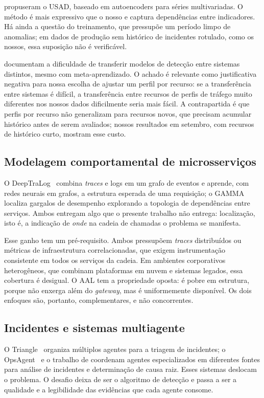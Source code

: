 \documentclass[sigconf,nonacm]{acmart}
\begin{document}
\citet{audibert2020usad} propuseram o USAD, baseado em autoencoders para séries multivariadas. O método é mais expressivo que o nosso e captura dependências entre indicadores. Há ainda a questão do treinamento, que pressupõe um período limpo de anomalias; em dados de produção sem histórico de incidentes rotulado, como os nossos, essa suposição não é verificável.

\citet{wang2025crosssystem} documentam a dificuldade de transferir modelos de detecção entre sistemas distintos, mesmo com meta-aprendizado. O achado é relevante como justificativa negativa para nossa escolha de ajustar um perfil por recurso: se a transferência entre sistemas é difícil, a transferência entre recursos de perfis de tráfego muito diferentes nos nossos dados dificilmente seria mais fácil. A contrapartida é que perfis por recurso não generalizam para recursos novos, que precisam acumular histórico antes de serem avaliados; nossos resultados em setembro, com recursos de histórico curto, mostram esse custo.

\subsection{Modelagem comportamental de microsserviços}
O DeepTraLog~\citep{zhang2022deeptralog} combina \emph{traces} e logs em um grafo de eventos e aprende, com redes neurais em grafos, a estrutura esperada de uma requisição; o GAMMA~\citep{somashekar2024gamma} localiza gargalos de desempenho explorando a topologia de dependências entre serviços. Ambos entregam algo que o presente trabalho não entrega: localização, isto é, a indicação de \emph{onde} na cadeia de chamadas o problema se manifesta.

Esse ganho tem um pré-requisito. Ambos pressupõem \emph{traces} distribuídos ou métricas de infraestrutura correlacionadas, que exigem instrumentação consistente em todos os serviços da cadeia. Em ambientes corporativos heterogêneos, que combinam plataformas em nuvem e sistemas legados, essa cobertura é desigual. O AAL tem a propriedade oposta: é pobre em estrutura, porque não enxerga além do \emph{gateway}, mas é uniformemente disponível. Os dois enfoques são, portanto, complementares, e não concorrentes.

\subsection{Incidentes e sistemas multiagente}
O Triangle~\citep{yu2025triangle} organiza múltiplos agentes para a triagem de incidentes; o OpsAgent~\citep{luo2025opsagent} e o trabalho de \citet{zhang2025isre} coordenam agentes especializados em diferentes fontes para análise de incidentes e determinação de causa raiz. Esses sistemas deslocam o problema. O desafio deixa de ser o algoritmo de detecção e passa a ser a qualidade e a legibilidade das evidências que cada agente consome.
\end{document}
